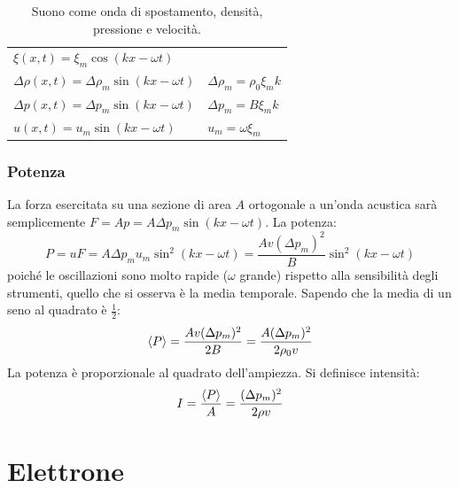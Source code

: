 \begin{table}[htbp]
	\centering
	\begin{tabular}{l|l}
		$\xi(x,t)=\xi_m\cos(kx-\omega t)$                 &                               \\
		$\Delta \rho(x,t)=\Delta \rho_m\sin(kx-\omega t)$ & $\Delta \rho_m=\rho_0\xi_m k$ \\
		$\Delta p(x,t)=\Delta p_m\sin(kx-\omega t)$       & $\Delta p_m=B\xi_m k$         \\
		$u(x,t)=u_m\sin(kx-\omega t)$                     & $u_m=\omega \xi_m$            \\
	\end{tabular}
	\caption{Suono come onda di spostamento, densità, pressione e velocità.}
	\label{tab:suono}
\end{table}

\subsection{Potenza}
La forza esercitata su una sezione di area $A$ ortogonale a un'onda acustica sarà semplicemente $F=Ap=A\Delta p_m\sin(kx - \omega t)$. La potenza:
\begin{equation}
	P = uF = A\Delta p_m u_m\sin^2(kx-\omega t) = \frac{Av(\Delta p_m)^2}{B}\sin^2(kx-\omega t)
\end{equation}
poiché le oscillazioni sono molto rapide ($\omega$ grande) rispetto alla sensibilità degli strumenti, quello che si osserva è la media temporale. Sapendo che la media di un seno al quadrato è $\frac{1}{2}$:
\begin{equation}
	\left<P\right> = \frac{Av(\Delta p_m)^2}{2B}=\frac{A(\Delta p_m)^2}{2\rho_0 v}
\end{equation}
La potenza è proporzionale al quadrato dell'ampiezza. Si definisce intensità:
\begin{equation}
	I=\frac{\left<P\right>}{A} = \frac{(\Delta p_m)^2}{2\rho v}
\end{equation}










\chapter{Elettrone}
\minitoc
